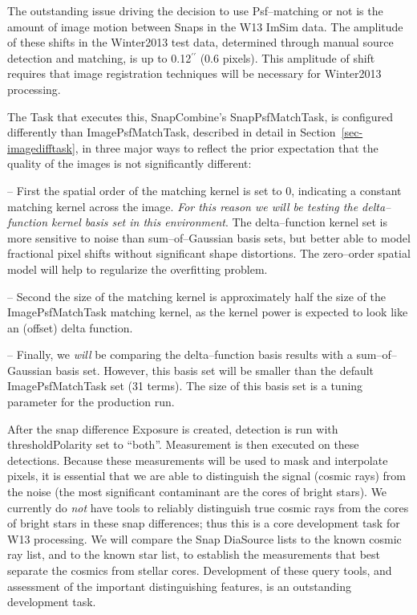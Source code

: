 \documentclass[prd, nofootinbib, floatfix, 11pt,tightenlines,times]{article}
\def\arcsec{^{\prime\prime}}
\begin{document}
The outstanding issue driving the decision to use Psf--matching or not
is the amount of image motion between Snaps in the W13 ImSim data.
The amplitude of these shifts in the Winter2013 test data, determined
through manual source detection and matching, is up to 0.12$\arcsec$
(0.6 pixels).  This amplitude of shift requires that image
registration techniques will be necessary for Winter2013 processing.

The Task that executes this, SnapCombine's SnapPsfMatchTask, is
configured differently than ImagePsfMatchTask, described in detail in
Section~\ref{sec-imagedifftask}, in three major ways to reflect the
prior expectation that the quality of the images is not significantly
different:

-- First the spatial order of the matching kernel is set to 0,
indicating a constant matching kernel across the image.  {\it For this
  reason we will be testing the delta--function kernel basis set in
  this environment}.  The delta--function kernel set is more sensitive
to noise than sum--of--Gaussian basis sets, but better able to model
fractional pixel shifts without significant shape distortions.  The
zero--order spatial model will help to regularize the overfitting
problem.

-- Second the size of the matching kernel is approximately half the
size of the ImagePsfMatchTask matching kernel, as the kernel power is
expected to look like an (offset) delta function.

-- Finally, we {\it will} be comparing the delta--function basis
results with a sum--of--Gaussian basis set.  However, this basis set
will be smaller than the default ImagePsfMatchTask set (31 terms).
The size of this basis set is a tuning parameter for the production
run.

After the snap difference Exposure is created, detection is run with
thresholdPolarity set to ``both''.  Measurement is then executed on
these detections.  Because these measurements will be used to mask and
interpolate pixels, it is essential that we are able to distinguish
the signal (cosmic rays) from the noise (the most significant
contaminant are the cores of bright stars).  We currently do {\it not}
have tools to reliably distinguish true cosmic rays from the cores of
bright stars in these snap differences; thus this is a core
development task for W13 processing.  We will compare the Snap
DiaSource lists to the known cosmic ray list, and to the known star
list, to establish the measurements that best separate the cosmics
from stellar cores.  Development of these query tools, and assessment
of the important distinguishing features, is an outstanding
development task.
\end{document}
